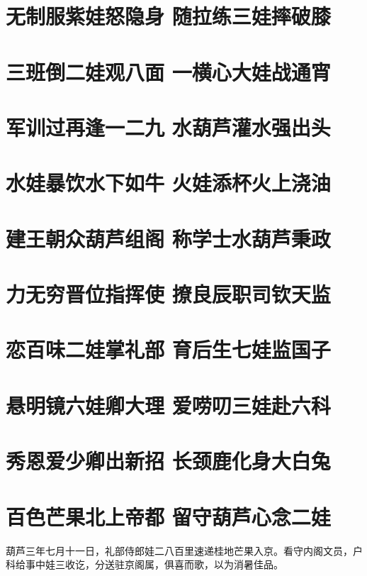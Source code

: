 \documentclass[12pt, a4paper]{book}
\begin{document}
\begin{CJK}{UTF8}{gbsn}
    \chapter{无制服紫娃怒隐身 随拉练三娃摔破膝}

    \chapter{三班倒二娃观八面 一横心大娃战通宵}

    \chapter{军训过再逢一二九 水葫芦灌水强出头}

    \chapter{水娃暴饮水下如牛 火娃添杯火上浇油}
    
    \chapter{建王朝众葫芦组阁 称学士水葫芦秉政}
    
    \chapter{力无穷晋位指挥使 撩良辰职司钦天监}
    
    \chapter{恋百味二娃掌礼部 育后生七娃监国子}
    
    \chapter{悬明镜六娃卿大理 爱唠叨三娃赴六科}
    
    \chapter{秀恩爱少卿出新招 长颈鹿化身大白兔}
    
    \chapter{百色芒果北上帝都 留守葫芦心念二娃}
    
    葫芦三年七月十一日，礼部侍郎娃二八百里速递桂地芒果入京。看守内阁文员，户科给事中娃三收讫，分送驻京阁属，俱喜而歌，以为消暑佳品。
    

\end{CJK}
\end{document}
